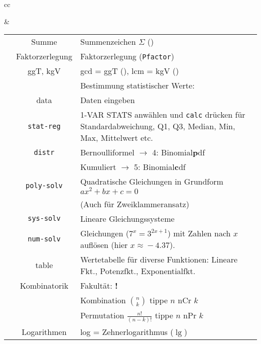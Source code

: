 \begin{tabular}{cc}


&

\begin{tabular}{c|c|p{80mm}}\hline
\tiprobutton{math}         &Summe             & Summenzeichen $\Sigma$ (\tiprobutton{5})\\
                           &Faktorzerlegung   & Faktorzerlegung (\tiprobutton{4}\texttt{Pfactor})\\
                           & ggT, kgV         & gcd = ggT
(\tiprobutton{3}), lcm = kgV (\tiprobutton{2})\\\hline
                           &                  & Bestimmung statistischer Werte:\\
\tiprobutton{data}         & data             & Daten eingeben\\
                           &\texttt{stat-reg} & 1-VAR STATS anwählen
und \texttt{calc} drücken für Standardabweichung, Q1, Q3, Median, Min,
Max, Mittelwert etc.\\
                           &\texttt{distr}    & Bernoulliformel $\rightarrow$ 4: Binomial\textbf{p}df\\
                           &                  & Kumuliert $\rightarrow$ 5: Binomial\textbf{c}df\\\hline
\tiprobutton{cos_poly-solv}&\texttt{poly-solv}&  Quadratische Gleichungen in Grundform $ax^2+bx+c=0$\\
                           &                  &  (Auch für Zweiklammeransatz)\\\hline
\tiprobutton{tan_sys-solv} &\texttt{sys-solv} &  Lineare Gleichungssysteme\\\hline
\tiprobutton{sin_num-solv} &\texttt{num-solv} &  Gleichungen ($7^x=3^{2x+1}$) mit Zahlen nach $x$ auf\/lösen (hier $x\approx{}-4.37$).\\\hline
\tiprobutton{table}        & table            &  Wertetabelle für diverse Funktionen: Lineare Fkt., Potenzfkt., Exponentialfkt.\\\hline
\tiprobutton{ncrnpr}       &Kombinatorik      &  Fakultät: {\color{red}\textbf{!}}\\
                           &                  &  Kombination $n \choose k$ tippe $n$ nCr $k$\\
                           &                  &  Permutation $\frac{n!}{(n-k)!}$ tippe $n$ nPr $k$\\\hline
\tiprobutton{ln_log}       &  Logarithmen     &  log = Zehnerlogarithmus ($\lg$)\\

\end{tabular}
\end{tabular}
